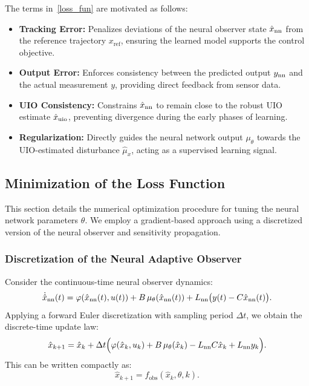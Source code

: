 The terms in~\eqref{loss_fun} are motivated as follows:
\begin{itemize}
    \item \textbf{Tracking Error:} Penalizes deviations of the neural observer state $\hat{x}_{\text{nn}}$ from the reference trajectory $x_{\text{ref}}$, ensuring the learned model supports the control objective.
    \item \textbf{Output Error:} Enforces consistency between the predicted output $y_{\text{nn}}$ and the actual measurement $y$, providing direct feedback from sensor data.
    \item \textbf{UIO Consistency:} Constrains $\hat{x}_{\text{nn}}$ to remain close to the robust UIO estimate $\hat{x}_{\text{uio}}$, preventing divergence during the early phases of learning.
    \item \textbf{Regularization:} Directly guides the neural network output $\mu_{\theta}$ towards the UIO-estimated disturbance $\hat{\mu}_{x}$, acting as a supervised learning signal.
\end{itemize}

\subsection{Minimization of the Loss Function}\label{ch4_sec4_minimization}

This section details the numerical optimization procedure for tuning the neural network parameters $\theta$. We employ a gradient-based approach using a discretized version of the neural observer and sensitivity propagation.

\subsubsection{Discretization of the Neural Adaptive Observer}

Consider the continuous-time neural observer dynamics:
\[
\dot{\hat{x}}_{\text{nn}}(t) = \varphi(\hat{x}_{\text{nn}}(t), u(t)) + B\,\mu_\theta(\hat{x}_{\text{nn}}(t)) + L_{\text{nn}}\big(y(t) - C\hat{x}_{\text{nn}}(t)\big).
\]
Applying a forward Euler discretization with sampling period $\Delta t$, we obtain the discrete-time update law:
\[
\hat{x}_{k+1} = \hat{x}_k + \Delta t \Big( \varphi(\hat{x}_k, u_k) + B\,\mu_\theta(\hat{x}_k) - L_{\text{nn}} C \hat{x}_k + L_{\text{nn}} y_k \Big).
\]
This can be written compactly as:
\begin{equation}\label{eq:obs_update}
\hat{x}_{k+1} = f_{\text{obs}}(\hat{x}_k, \theta, k).
\end{equation}

